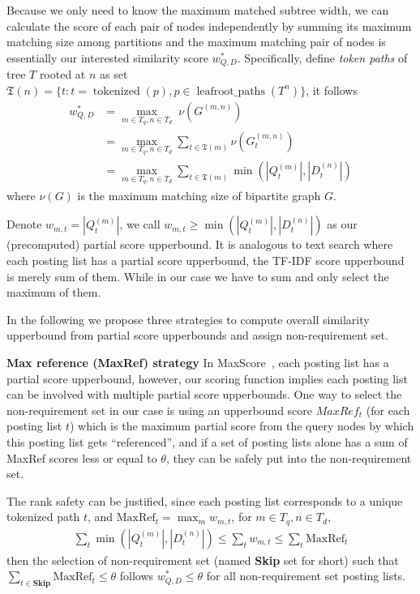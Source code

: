 \documentclass[runningheads]{llncs}
\begin{document}
Because we only need to know the maximum matched subtree width, we can calculate the score of each pair of nodes independently by summing its maximum matching size among partitions and the maximum  matching pair of nodes is essentially our interested similarity score $w^*_{Q, D}$.
Specifically,
%
define \textit{token paths} of tree $T$ rooted at $n$ as set $\mathfrak{T}(n) = \{t: t = \operatorname{tokenized}(p), p \in \operatorname{leafroot\_paths}(T^n) \}$, it follows
\begin{align}
w^*_{Q, D} &= \max_{m \in T_q, n \in T_d} \; \nu(G^{(m, n)}) \\
           &= \max_{m \in T_q, n \in T_d} \sum_{t \in \mathfrak{T}(m)} \nu(G^{(m, n)}_t) \\
		   \label{eq:5}
           &= \max_{m \in T_q, n \in T_d} \sum_{t \in \mathfrak{T}(m)} \min(|Q^{(m)}_t|, |D^{(n)}_t|)
\end{align}
where $\nu(G)$ is the maximum matching size of bipartite graph $G$.

Denote $w_{m, t} = |Q^{(m)}_t|$, we call $w_{m, t} \ge \min(|Q^{(m)}_t|, |D^{(n)}_t|)$ as our (precomputed) partial score upperbound.
It is analogous to text search where each posting list has a partial score upperbound, the TF-IDF score upperbound is merely sum of them. While in our case we have to sum and only select the maximum of them.

In the following we propose three strategies to compute overall similarity upperbound from partial score upperbounds and assign non-requirement set.

\vspace{0.1in}
\noindent \textbf{Max reference (MaxRef) strategy}\;
In MaxScore~\cite{turtle_flood_1995, strohman_turtle_2005}, each posting list has a partial score upperbound, however, our scoring function implies each posting list can be involved with multiple partial score upperbounds.
One way to select the non-requirement set in our case is using an upperbound score $MaxRef_t$ (for each posting list $t$) which is the maximum partial score from the query nodes by which this posting list gets ``referenced'', and if a set of posting lists alone has a sum of MaxRef scores less or equal to $\theta$, they can be safely put into the non-requirement set.

The rank safety can be justified, since each posting list corresponds to a unique tokenized path $t$, and $\text{MaxRef}_t = \max_m w_{m, t}$,
for $m \in T_q, n \in T_d$,
\begin{align}
\label{eq:6}
\sum_t \min(|Q^{(m)}_t|, |D^{(n)}_t|) \le \sum_t w_{m,t} \le \sum_t \text{MaxRef}_t
\end{align}
then the selection of non-requirement set (named \textbf{Skip} set for short) such that 
$\sum_{t \in \textbf{Skip}} \text{MaxRef}_t \le \theta$
follows $w^*_{Q, D} \le \theta$ for all non-requirement set posting lists.
\end{document}
